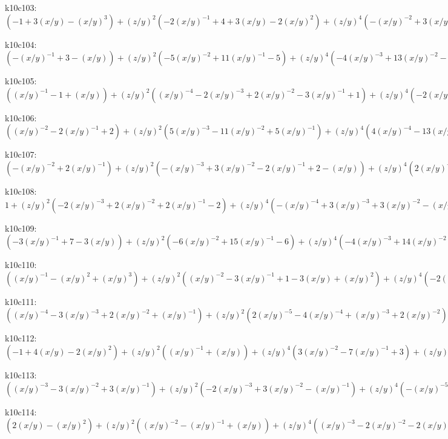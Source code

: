 k10c103: $ (-1+3(x/y)-(x/y)^{3})  +(z/y)^{2}(-2(x/y)^{-1}+4+3(x/y)-2(x/y)^{2})  +(z/y)^{4}(-(x/y)^{-2}+3(x/y)^{-1}+3-(x/y))  +(z/y)^{6}((x/y)^{-2}+(x/y)^{-1}) $ 

k10c104: $ (-(x/y)^{-1}+3-(x/y))  +(z/y)^{2}(-5(x/y)^{-2}+11(x/y)^{-1}-5)  +(z/y)^{4}(-4(x/y)^{-3}+13(x/y)^{-2}-4(x/y)^{-1})  +(z/y)^{6}(-(x/y)^{-4}+6(x/y)^{-3}-(x/y)^{-2})  +(x/y)^{-4}(z/y)^{8} $ 

k10c105: $ ((x/y)^{-1}-1+(x/y))  +(z/y)^{2}((x/y)^{-4}-2(x/y)^{-3}+2(x/y)^{-2}-3(x/y)^{-1}+1)  +(z/y)^{4}(-2(x/y)^{-4}+2(x/y)^{-3}-2(x/y)^{-2})  +(x/y)^{-4}(z/y)^{6} $ 

k10c106: $ ((x/y)^{-2}-2(x/y)^{-1}+2)  +(z/y)^{2}(5(x/y)^{-3}-11(x/y)^{-2}+5(x/y)^{-1})  +(z/y)^{4}(4(x/y)^{-4}-13(x/y)^{-3}+4(x/y)^{-2})  +(z/y)^{6}((x/y)^{-5}-6(x/y)^{-4}+(x/y)^{-3})  -(x/y)^{-5}(z/y)^{8} $ 

k10c107: $ (-(x/y)^{-2}+2(x/y)^{-1})  +(z/y)^{2}(-(x/y)^{-3}+3(x/y)^{-2}-2(x/y)^{-1}+2-(x/y))  +(z/y)^{4}(2(x/y)^{-3}-2(x/y)^{-2}+2(x/y)^{-1})  -(x/y)^{-3}(z/y)^{6} $ 

k10c108: $ 1  +(z/y)^{2}(-2(x/y)^{-3}+2(x/y)^{-2}+2(x/y)^{-1}-2)  +(z/y)^{4}(-(x/y)^{-4}+3(x/y)^{-3}+3(x/y)^{-2}-(x/y)^{-1})  +(z/y)^{6}((x/y)^{-4}+(x/y)^{-3}) $ 

k10c109: $ (-3(x/y)^{-1}+7-3(x/y))  +(z/y)^{2}(-6(x/y)^{-2}+15(x/y)^{-1}-6)  +(z/y)^{4}(-4(x/y)^{-3}+14(x/y)^{-2}-4(x/y)^{-1})  +(z/y)^{6}(-(x/y)^{-4}+6(x/y)^{-3}-(x/y)^{-2})  +(x/y)^{-4}(z/y)^{8} $ 

k10c110: $ ((x/y)^{-1}-(x/y)^{2}+(x/y)^{3})  +(z/y)^{2}((x/y)^{-2}-3(x/y)^{-1}+1-3(x/y)+(x/y)^{2})  +(z/y)^{4}(-2(x/y)^{-2}+2(x/y)^{-1}-2)  +(x/y)^{-2}(z/y)^{6} $ 

k10c111: $ ((x/y)^{-4}-3(x/y)^{-3}+2(x/y)^{-2}+(x/y)^{-1})  +(z/y)^{2}(2(x/y)^{-5}-4(x/y)^{-4}+(x/y)^{-3}+2(x/y)^{-2})  +(z/y)^{4}((x/y)^{-6}-3(x/y)^{-5}-2(x/y)^{-4}+(x/y)^{-3})  +(z/y)^{6}(-(x/y)^{-6}-(x/y)^{-5}) $ 

k10c112: $ (-1+4(x/y)-2(x/y)^{2})  +(z/y)^{2}((x/y)^{-1}+(x/y))  +(z/y)^{4}(3(x/y)^{-2}-7(x/y)^{-1}+3)  +(z/y)^{6}((x/y)^{-3}-5(x/y)^{-2}+(x/y)^{-1})  -(x/y)^{-3}(z/y)^{8} $ 

k10c113: $ ((x/y)^{-3}-3(x/y)^{-2}+3(x/y)^{-1})  +(z/y)^{2}(-2(x/y)^{-3}+3(x/y)^{-2}-(x/y)^{-1})  +(z/y)^{4}(-(x/y)^{-5}+(x/y)^{-4}+2(x/y)^{-3}-(x/y)^{-2})  +(z/y)^{6}((x/y)^{-5}+(x/y)^{-4}) $ 

k10c114: $ (2(x/y)-(x/y)^{2})  +(z/y)^{2}((x/y)^{-2}-(x/y)^{-1}+(x/y))  +(z/y)^{4}((x/y)^{-3}-2(x/y)^{-2}-2(x/y)^{-1}+1)  +(z/y)^{6}(-(x/y)^{-3}-(x/y)^{-2}) $ 

